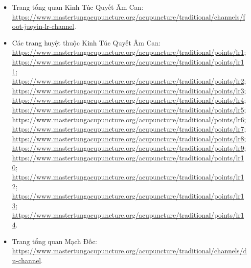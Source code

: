 \documentclass[12pt,a4paper]{article}
\begin{document}
\begin{itemize}
\url{https://www.mastertungacupuncture.org/acupuncture/traditional/points/gb38}; \url{https://www.mastertungacupuncture.org/acupuncture/traditional/points/gb39}; \url{https://www.mastertungacupuncture.org/acupuncture/traditional/points/gb40}; \url{https://www.mastertungacupuncture.org/acupuncture/traditional/points/gb42}; \url{https://www.mastertungacupuncture.org/acupuncture/traditional/points/gb43}.
  \item Trang tổng quan Kinh Túc Quyết Âm Can: \url{https://www.mastertungacupuncture.org/acupuncture/traditional/channels/foot-jueyin-lr-channel}.
  \item Các trang huyệt thuộc Kinh Túc Quyết Âm Can: \url{https://www.mastertungacupuncture.org/acupuncture/traditional/points/lr1}; \url{https://www.mastertungacupuncture.org/acupuncture/traditional/points/lr11}; \url{https://www.mastertungacupuncture.org/acupuncture/traditional/points/lr2}; \url{https://www.mastertungacupuncture.org/acupuncture/traditional/points/lr3}; \url{https://www.mastertungacupuncture.org/acupuncture/traditional/points/lr4}; \url{https://www.mastertungacupuncture.org/acupuncture/traditional/points/lr5}; \url{https://www.mastertungacupuncture.org/acupuncture/traditional/points/lr6}; \url{https://www.mastertungacupuncture.org/acupuncture/traditional/points/lr7}; \url{https://www.mastertungacupuncture.org/acupuncture/traditional/points/lr8}; \url{https://www.mastertungacupuncture.org/acupuncture/traditional/points/lr9}; \url{https://www.mastertungacupuncture.org/acupuncture/traditional/points/lr10}; \url{https://www.mastertungacupuncture.org/acupuncture/traditional/points/lr12}; \url{https://www.mastertungacupuncture.org/acupuncture/traditional/points/lr13}; \url{https://www.mastertungacupuncture.org/acupuncture/traditional/points/lr14}.
  \item Trang tổng quan Mạch Đốc: \url{https://www.mastertungacupuncture.org/acupuncture/traditional/channels/du-channel}.

\end{itemize}
\end{document}
